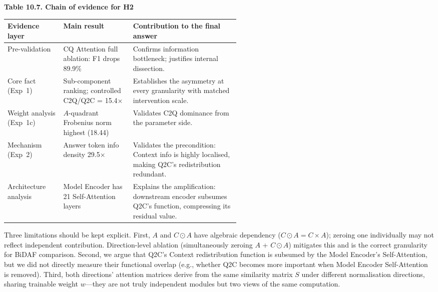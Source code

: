 \documentclass[10pt]{article}
\begin{document}
\small
\begin{center}
{\bfseries Table 10.7. Chain of evidence for H2}\\[0.25em]
\begin{tabularx}{0.96\linewidth}{>{\raggedright\arraybackslash}p{0.24\linewidth}>{\raggedright\arraybackslash}p{0.30\linewidth}>{\raggedright\arraybackslash}X}
\toprule
\textbf{Evidence layer} & \textbf{Main result} & \textbf{Contribution to the final answer}\\
\midrule
Pre-validation & CQ Attention full ablation: F1 drops 89.9\% & Confirms information bottleneck; justifies internal dissection.\\
Core fact (Exp~1) & Sub-component ranking; controlled C2Q/Q2C = 15.4$\times$ & Establishes the asymmetry at every granularity with matched intervention scale.\\
Weight analysis (Exp~1c) & $A$-quadrant Frobenius norm highest (18.44) & Validates C2Q dominance from the parameter side.\\
Mechanism (Exp~2) & Answer token info density 29.5$\times$ & Validates the precondition: Context info is highly localised, making Q2C's redistribution redundant.\\
Architecture analysis & Model Encoder has 21 Self-Attention layers & Explains the amplification: downstream encoder subsumes Q2C's function, compressing its residual value.\\
\bottomrule
\end{tabularx}
\end{center}
\normalsize

Three limitations should be kept explicit. First, $A$ and $C \odot A$ have algebraic dependency ($C \odot A = C \times A$); zeroing one individually may not reflect independent contribution. Direction-level ablation (simultaneously zeroing $A$ + $C \odot A$) mitigates this and is the correct granularity for BiDAF comparison. Second, we argue that Q2C's Context redistribution function is subsumed by the Model Encoder's Self-Attention, but we did not directly measure their functional overlap (e.g., whether Q2C becomes more important when Model Encoder Self-Attention is removed). Third, both directions' attention matrices derive from the same similarity matrix $S$ under different normalisation directions, sharing trainable weight $w$---they are not truly independent modules but two views of the same computation.

\end{document}
